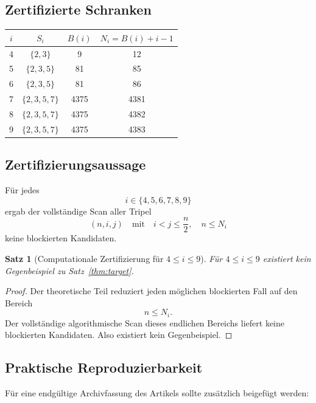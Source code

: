 \documentclass[12pt,a4paper]{article}
\theoremstyle{plain}
\newtheorem{theorem}{Satz}[section]
\theoremstyle{definition}
\theoremstyle{remark}
\begin{document}
	\subsection{Zertifizierte Schranken}
	
	\begin{center}
		\begin{tabular}{cccc}
			\toprule
			\(i\) & \(S_i\) & \(B(i)\) & \(N_i=B(i)+i-1\) \\
			\midrule
			4 & \(\{2,3\}\)     & 9    & 12   \\
			5 & \(\{2,3,5\}\)   & 81   & 85   \\
			6 & \(\{2,3,5\}\)   & 81   & 86   \\
			7 & \(\{2,3,5,7\}\) & 4375 & 4381 \\
			8 & \(\{2,3,5,7\}\) & 4375 & 4382 \\
			9 & \(\{2,3,5,7\}\) & 4375 & 4383 \\
			\bottomrule
		\end{tabular}
	\end{center}
	
	\subsection{Zertifizierungsaussage}
	
	Für jedes
	\[
	i\in\{4,5,6,7,8,9\}
	\]
	ergab der vollständige Scan aller Tripel
	\[
	(n,i,j)\quad\text{mit}\quad i<j\le \frac n2,\quad n\le N_i
	\]
	keine blockierten Kandidaten.
	
	\begin{theorem}[Computationale Zertifizierung für \(4\le i\le9\)]
		\label{thm:small_i_certified}
		Für \(4\le i\le9\) existiert kein Gegenbeispiel zu Satz~\ref{thm:target}.
	\end{theorem}
	
	\begin{proof}
		Der theoretische Teil reduziert jeden möglichen blockierten Fall auf den Bereich
		\[
		n\le N_i.
		\]
		Der vollständige algorithmische Scan dieses endlichen Bereichs liefert keine blockierten Kandidaten. Also existiert kein Gegenbeispiel.
	\end{proof}
	
	\subsection{Praktische Reproduzierbarkeit}
	
	Für eine endgültige Archivfassung des Artikels sollte zusätzlich beigefügt werden:
	
\end{document}
